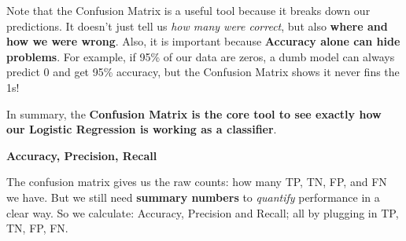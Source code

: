 \highspace
Note that the Confusion Matrix is a useful tool because it breaks down our predictions. It doesn't just tell us \emph{how many were correct}, but also \textbf{where and how we were wrong}. Also, it is important because \textbf{Accuracy alone can hide problems}. For example, if 95\% of our data are zeros, a dumb model can always predict 0 and get 95\% accuracy, but the Confusion Matrix shows it never fins the 1s!

\highspace
In summary, the \textbf{Confusion Matrix is the core tool to see exactly how our Logistic Regression is working as a classifier}.

\highspace
\begin{flushleft}
    \textcolor{Green3}{ \textbf{Accuracy, Precision, Recall}}
\end{flushleft}
The confusion matrix gives us the raw counts: how many TP, TN, FP, and FN we have. But we still need \textbf{summary numbers} to \emph{quantify} performance in a clear way. So we calculate: Accuracy, Precision and Recall; all by plugging in TP, TN, FP, FN.
